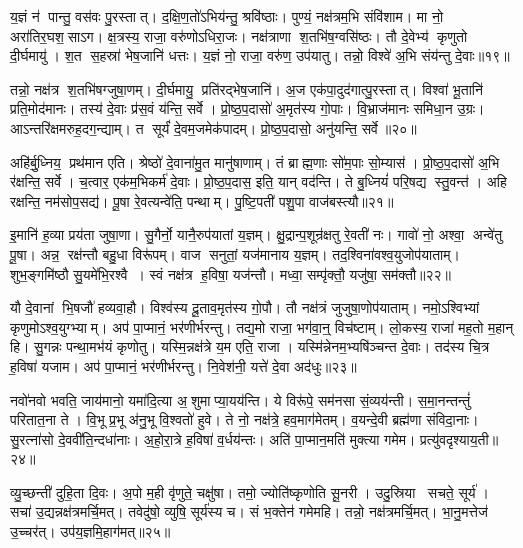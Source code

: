 य॒ज्ञं न॑ पान्तु॒ वस॑वः पु॒रस्तात्।
द॒क्षि॒ण॒तो॑ऽभिय॑न्तु॒ श्रवि॑ष्ठाः।
पुण्यं॒ नक्ष॑त्रम॒भि संवि॑शाम।
मा नो॒ अरा॑तिर॒घश॒साऽग\sn{}।
क्ष॒त्रस्य॒ राजा॒ वरु॑णोऽधिरा॒जः।
नक्ष॑त्राणा श॒तभि॑ष॒ग्वसि॑ष्ठः।
तौ दे॒वेभ्य॑ कृणुतो दी॒र्घमायु॑।
श॒त स॒हस्रा॑ भेष॒जानि॑ धत्तः।
य॒ज्ञं नो॒ राजा॒ वरु॑ण॒ उप॑यातु।
तन्नो॒ विश्वे॑ अ॒भि संय॑न्तु दे॒वाः॥१९॥

तन्नो॒ नक्ष॑त्र श॒तभि॑षग्जुषा॒णम्।
दी॒र्घमायु॒ प्रति॑रद्भेष॒जानि॑।
अ॒ज एक॑पा॒दुद॑गात्पु॒रस्तात्।
विश्वा॑ भू॒तानि॑ प्रति॒मोद॑मानः।
तस्य॑ दे॒वाः प्र॑स॒वं य॑न्ति॒ सर्वे।
प्रो॒ष्ठ॒प॒दासो॑ अ॒मृत॑स्य गो॒पाः।
वि॒भ्राज॑मानः समिधा॒न उ॒ग्रः।
आऽन्तरि॑क्षमरुह॒दग॒न्द्याम्।
त सूर्यं॑ दे॒वम॒जमेक॑पादम्।
प्रो॒ष्ठ॒प॒दासो॒ अनु॑यन्ति॒ सर्वे॥२०॥

अहि॑र्बु॒ध्निय॒ प्रथ॑मान एति।
श्रेष्ठो॑ दे॒वाना॑मु॒त मानु॑षाणाम्।
तं ब्राह्म॒णाः सो॑म॒पाः सो॒म्यास॑।
प्रो॒ष्ठ॒प॒दासो॑ अ॒भि र॑क्षन्ति॒ सर्वे।
च॒त्वार॒ एक॑म॒भिकर्म॑ दे॒वाः।
प्रो॒ष्ठ॒प॒दास॒ इति॒ यान् वद॑न्ति।
ते बु॒ध्नियं॑ परि॒षद्य स्तु॒वन्त॑।
अहि रक्षन्ति॒ नम॑सोप॒सद्य॑।
पू॒षा रे॒वत्यन्वे॑ति॒ पन्थाम्।
पु॒ष्टि॒पती॑ पशु॒पा वाज॑बस्त्यौ॥२१॥

इ॒मानि॑ ह॒व्या प्रय॑ता जुषा॒णा।
सु॒गैर्नो॒ यानै॒रुप॑यातां य॒ज्ञम्।
क्षु॒द्रान्प॒शून्र॑क्षतु रे॒वती॑ नः।
गावो॑ नो॒ अश्वा॒ अन्वे॑तु पू॒षा।
अन्न॒ रक्ष॑न्तौ बहु॒धा विरू॑पम्।
वाज सनुतां॒ यज॑मानाय य॒ज्ञम्।
तद॒श्विना॑वश्व॒युजोप॑याताम्।
शुभ॒ङ्गमि॑ष्ठौ सु॒यमे॑भि॒रश्वै।
स्वं नक्ष॑त्र ह॒विषा॒ यज॑न्तौ।
मध्वा॒ सम्पृ॑क्तौ॒ यजु॑षा॒ सम॑क्तौ॥२२॥

यौ दे॒वानां भि॒षजौ॑ हव्यवा॒हौ।
विश्व॑स्य दू॒ताव॒मृत॑स्य गो॒पौ।
तौ नक्ष॑त्रं जुजुषा॒णोप॑याताम्।
नमो॒ऽश्विभ्यां कृणुमोऽश्व॒युग्भ्याम्।
अप॑ पा॒प्मानं॒ भर॑णीर्भरन्तु।
तद्य॒मो राजा॒ भग॑वा॒न्॒ विच॑ष्टाम्।
लो॒कस्य॒ राजा॑ मह॒तो म॒हान् हि।
सु॒गन्नः पन्था॒मभ॑यं कृणोतु।
यस्मि॒न्नक्ष॑त्रे य॒म एति॒ राजा।
यस्मि॑न्नेनम॒भ्यषि॑ञ्चन्त दे॒वाः।
तद॑स्य चि॒त्र ह॒विषा॑ यजाम।
अप॑ पा॒प्मानं॒ भर॑णीर्भरन्तु।
नि॒वेश॑नी॒ यत्ते॑ दे॒वा अद॑धुः॥२३॥\anuvakamend[त॒तार॒ मह्यं॑ प्रास॒चीर्या यान्तु य॒ज्ञं वाच स्व॒स्ति दे॒वा अनु॑यन्ति॒ सर्वे॒ वाज॑बस्त्यौ॒ सम॑क्तौ दे॒वास्त्रीणि॑ च]

नवो॑नवो भवति॒ जाय॑मानो॒ यमा॑दि॒त्या अ॒शुमाप्या॒यय॑न्ति।
ये विरू॑पे॒ सम॑नसा सं॒व्यय॑न्ती।
स॒मा॒नन्तन्तुं॑ परितात॒ना ते।
वि॒भू प्र॒भू अ॑नु॒भू वि॒श्वतो॑ हुवे।
ते नो॒ नक्ष॑त्रे॒ हव॒माग॑मेतम्।
व॒यन्दे॒वी ब्रह्म॑णा संविदा॒नाः।
सु॒रत्ना॑सो दे॒ववी॑ति॒न्दधा॑नाः।
अ॒हो॒रा॒त्रे ह॒विषा॑ व॒र्धय॑न्तः।
अति॑ पा॒प्मान॒मति॑ मुक्त्या गमेम।
प्रत्यु॑वदृश्याय॒ती॥२४॥

व्यु॒च्छन्ती॑ दुहि॒ता दि॒वः।
अ॒पो म॒ही वृ॑णुते॒ चक्षु॑षा।
तमो॒ ज्योति॑ष्कृणोति सू॒नरी।
उदु॒स्रिया सचते॒ सूर्य॑।
सचा॑ उ॒द्यन्नक्ष॑त्रमर्चि॒मत्।
तवेदु॑षो॒ व्युषि॒ सूर्य॑स्य च।
सं भ॒क्तेन॑ गमेमहि।
तन्नो॒ नक्ष॑त्रमर्चि॒मत्।
भा॒नु॒मत्तेज॑ उ॒च्चर॑त्।
उप॑य॒ज्ञमि॒हाग॑मत्॥२५॥

